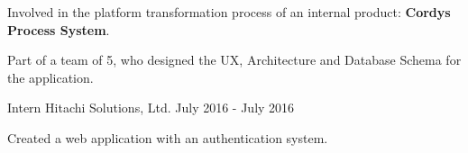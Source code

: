 \begin{cventries}
{{\begin{cvitems}
        \item {Involved in the platform transformation process of an internal product: \textbf{Cordys Process System}.}
        \item {Part of a team of 5, who designed the UX, Architecture and Database Schema for the application.}
      \end{cvitems} 
    }
  \cventry
    {Intern}
    {Hitachi Solutions, Ltd.}
    {}
    {July 2016 - July 2016}
    {
      \begin{cvitems}
        \item {Created a web application with an authentication system.}    
      \end{cvitems}
    }
}
\end{cventries}